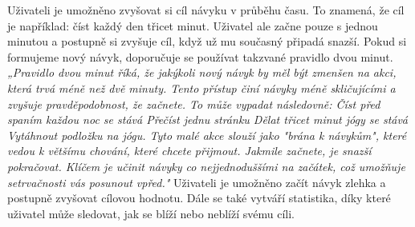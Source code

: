Uživateli je umožněno zvyšovat si cíl návyku v průběhu času. To znamená, že cíl je například: číst každý den třicet minut. Uživatel ale začne pouze s jednou minutou a postupně si zvyšuje cíl, když už mu současný připadá snazší. Pokud si formujeme nový návyk, doporučuje se používat takzvané pravidlo dvou minut. \textit{„Pravidlo dvou minut říká, že jakýkoli nový návyk by měl být zmenšen na akci, která trvá méně než dvě minuty. Tento přístup činí návyky méně skličujícími a zvyšuje pravděpodobnost, že začnete. To může vypadat následovně: Číst před spaním každou noc se stává Přečíst jednu stránku Dělat třicet minut jógy se stává Vytáhnout podložku na jógu. Tyto malé akce slouží jako "brána k návykům", které vedou k většímu chování, které chcete přijmout. Jakmile začnete, je snazší pokračovat. Klíčem je učinit návyky co nejjednoduššími na začátek, což umožňuje setrvačnosti vás posunout vpřed."}\cite{sobrief_atomic_habits} Uživateli je umožněno začít návyk zlehka a postupně zvyšovat cílovou hodnotu. Dále se také vytváří statistika, díky které uživatel může sledovat, jak se blíží nebo neblíží svému cíli.
